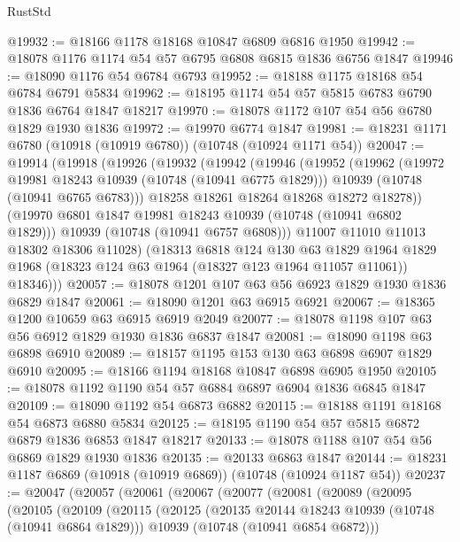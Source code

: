 \begin{lexlean}{RustStd}
\begin{coremodule}
@19932 := @18166 @1178 @18168 @10847 @6809 @6816 @1950
@19942 := @18078 @1176 @1174 @54 @57 @6795 @6808 @6815 @1836 @6756 @1847
@19946 := @18090 @1176 @54 @6784 @6793
@19952 := @18188 @1175 @18168 @54 @6784 @6791 @5834
@19962 := @18195 @1174 @54 @57 @5815 @6783 @6790 @1836 @6764 @1847 @18217
@19970 := @18078 @1172 @107 @54 @56 @6780 @1829 @1930 @1836
@19972 := @19970 @6774 @1847
@19981 := @18231 @1171 @6780 (@10918 (@10919 @6780)) (@10748 (@10924 @1171 @54))
@20047 := @19914
    (@19918
      (@19926
        (@19932
          (@19942
            (@19946
              (@19952
                (@19962
                  (@19972 @19981 @18243 @10939 (@10748 (@10941 @6775 @1829)))
                  @10939
                  (@10748 (@10941 @6765 @6783)))
                @18258
                @18261
                @18264
                @18268
                @18272
                @18278))
            (@19970 @6801 @1847 @19981 @18243 @10939 (@10748 (@10941 @6802 @1829)))
            @10939
            (@10748 (@10941 @6757 @6808)))
          @11007
          @11010
          @11013
          @18302
          @18306
          @11028)
        (@18313
          @6818
          @124
          @130
          @63
          @1829
          @1964
          @1829
          @1968
          (@18323 @124 @63 @1964 (@18327 @123 @1964 @11057 @11061))
          @18346)))
@20057 := @18078 @1201 @107 @63 @56 @6923 @1829 @1930 @1836 @6829 @1847
@20061 := @18090 @1201 @63 @6915 @6921
@20067 := @18365 @1200 @10659 @63 @6915 @6919 @2049
@20077 := @18078 @1198 @107 @63 @56 @6912 @1829 @1930 @1836 @6837 @1847
@20081 := @18090 @1198 @63 @6898 @6910
@20089 := @18157 @1195 @153 @130 @63 @6898 @6907 @1829 @6910
@20095 := @18166 @1194 @18168 @10847 @6898 @6905 @1950
@20105 := @18078 @1192 @1190 @54 @57 @6884 @6897 @6904 @1836 @6845 @1847
@20109 := @18090 @1192 @54 @6873 @6882
@20115 := @18188 @1191 @18168 @54 @6873 @6880 @5834
@20125 := @18195 @1190 @54 @57 @5815 @6872 @6879 @1836 @6853 @1847 @18217
@20133 := @18078 @1188 @107 @54 @56 @6869 @1829 @1930 @1836
@20135 := @20133 @6863 @1847
@20144 := @18231 @1187 @6869 (@10918 (@10919 @6869)) (@10748 (@10924 @1187 @54))
@20237 := @20047
    (@20057
      (@20061
        (@20067
          (@20077
            (@20081
              (@20089
                (@20095
                  (@20105
                    (@20109
                      (@20115
                        (@20125
                          (@20135 @20144 @18243 @10939 (@10748 (@10941 @6864 @1829)))
                          @10939
                          (@10748 (@10941 @6854 @6872)))

\end{coremodule}
\end{lexlean}
